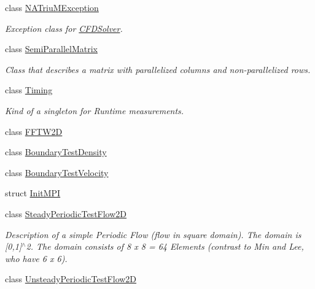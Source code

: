 \begin{DoxyCompactItemize}
class \hyperlink{classnatrium_1_1NATriuMException}{NATriuMException}
\begin{DoxyCompactList}\small\item\em Exception class for \hyperlink{classnatrium_1_1CFDSolver}{CFDSolver}. \item\end{DoxyCompactList}\item 
class \hyperlink{classnatrium_1_1SemiParallelMatrix}{SemiParallelMatrix}
\begin{DoxyCompactList}\small\item\em Class that describes a matrix with parallelized columns and non-\/parallelized rows. \item\end{DoxyCompactList}\item 
class \hyperlink{classnatrium_1_1Timing}{Timing}
\begin{DoxyCompactList}\small\item\em Kind of a singleton for Runtime measurements. \item\end{DoxyCompactList}\item 
class \hyperlink{classnatrium_1_1FFTW2D}{FFTW2D}
\item 
class \hyperlink{classnatrium_1_1BoundaryTestDensity}{BoundaryTestDensity}
\item 
class \hyperlink{classnatrium_1_1BoundaryTestVelocity}{BoundaryTestVelocity}
\item 
struct \hyperlink{structnatrium_1_1InitMPI}{InitMPI}
\item 
class \hyperlink{classnatrium_1_1SteadyPeriodicTestFlow2D}{SteadyPeriodicTestFlow2D}
\begin{DoxyCompactList}\small\item\em Description of a simple Periodic Flow (flow in square domain). The domain is \mbox{[}0,1\mbox{]}$^\wedge$2. The domain consists of 8 x 8 = 64 Elements (contrast to Min and Lee, who have 6 x 6). \item\end{DoxyCompactList}\item 
class \hyperlink{classnatrium_1_1UnsteadyPeriodicTestFlow2D}{UnsteadyPeriodicTestFlow2D}
\end{DoxyCompactItemize}
